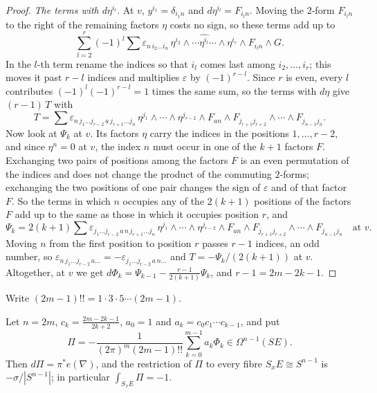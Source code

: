 \begin{proof}
\emph{The terms with $d\eta^{i_l}$.} At $v$, $y^{i_1} = \delta_{i_1n}$ and $d\eta^{i_l} = F_{i_ln}$. Moving the $2$-form $F_{i_ln}$ to the right of the remaining factors $\eta$ costs no sign, so
these terms add up to
\[
\sum_{l=2}^r(-1)^l\sum\varepsilon_{n\,i_2 \ldots i_n}\,\eta^{i_2} \wedge \cdots \widehat{\eta^{i_l}} \cdots \wedge \eta^{i_r} \wedge F_{i_ln} \wedge G .
\]
In the $l$-th term rename the indices so that $i_l$ comes last among $i_2, \ldots, i_r$; this moves it past $r - l$ indices and multiplies $\varepsilon$ by $(-1)^{r-l}$. Since $r$ is even,
every $l$ contributes $(-1)^l(-1)^{r-l} = 1$ times the same sum, so the terms with $d\eta$ give $(r-1)\,T$ with
\[
T = \sum\varepsilon_{n\,j_1 \ldots j_{r-2}\,a\,j_{r+1} \ldots j_n}\,\eta^{j_1} \wedge \cdots \wedge \eta^{j_{r-2}} \wedge F_{an} \wedge F_{j_{r+1}j_{r+2}} \wedge \cdots \wedge F_{j_{n-1}j_n} .
\]
Now look at $\Psi_k$ at $v$. Its factors $\eta$ carry the indices in the positions $1, \ldots, r - 2$, and since $\eta^n = 0$ at $v$, the index $n$ must occur in one of the $k + 1$ factors $F$.
Exchanging two pairs of positions among the factors $F$ is an even permutation of the indices and does not change the product of the commuting $2$-forms; exchanging the two positions
of one pair changes the sign of $\varepsilon$ and of that factor $F$. So the terms in which $n$ occupies any of the $2(k+1)$ positions of the factors $F$ add up to the same as those in
which it occupies position $r$, and
\[
\Psi_k = 2(k+1)\sum\varepsilon_{j_1 \ldots j_{r-2}\,a\,n\,j_{r+1} \ldots j_n}\,\eta^{j_1} \wedge \cdots \wedge \eta^{j_{r-2}} \wedge F_{an} \wedge F_{j_{r+1}j_{r+2}} \wedge \cdots \wedge F_{j_{n-1}j_n} \quad\text{at } v.
\]
Moving $n$ from the first position to position $r$ passes $r - 1$ indices, an odd number, so $\varepsilon_{n\,j_1 \ldots j_{r-2}\,a \ldots} = -\varepsilon_{j_1 \ldots j_{r-2}\,a\,n \ldots}$ and
$T = -\Psi_k/(2(k+1))$ at $v$. Altogether, at $v$ we get $d\Phi_k = \Psi_{k-1} - \frac{r - 1}{2(k+1)}\Psi_k$, and $r - 1 = 2m - 2k - 1$.
\end{proof}

Write $(2m-1)!! = 1 \cdot 3 \cdot 5 \cdots (2m-1)$.

\begin{proposition}[Chern]\label{characteristic-classes:proposition-transgression}
Let $n = 2m$, $c_k = \frac{2m-2k-1}{2k+2}$, $a_0 = 1$ and $a_k = c_0c_1 \cdots c_{k-1}$, and put
\[
\Pi = -\frac{1}{(2\pi)^m(2m-1)!!}\sum_{k=0}^{m-1}a_k\Phi_k \in \Omega^{n-1}(SE) .
\]
Then $d\Pi = \pi^*e(\nabla)$, and the restriction of $\Pi$ to every fibre $S_xE \cong S^{n-1}$ is $-\sigma/|S^{n-1}|$; in particular $\int_{S_xE}\Pi = -1$.
\end{proposition}

